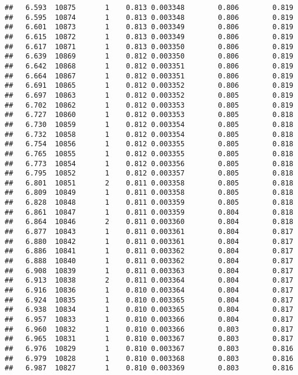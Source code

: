 \documentclass[
]{book}
\begin{document}
\begin{verbatim}
##   6.593  10875       1    0.813 0.003348        0.806        0.819
##   6.595  10874       1    0.813 0.003348        0.806        0.819
##   6.601  10873       1    0.813 0.003349        0.806        0.819
##   6.615  10872       1    0.813 0.003349        0.806        0.819
##   6.617  10871       1    0.813 0.003350        0.806        0.819
##   6.639  10869       1    0.812 0.003350        0.806        0.819
##   6.642  10868       1    0.812 0.003351        0.806        0.819
##   6.664  10867       1    0.812 0.003351        0.806        0.819
##   6.691  10865       1    0.812 0.003352        0.806        0.819
##   6.697  10863       1    0.812 0.003352        0.805        0.819
##   6.702  10862       1    0.812 0.003353        0.805        0.819
##   6.727  10860       1    0.812 0.003353        0.805        0.818
##   6.730  10859       1    0.812 0.003354        0.805        0.818
##   6.732  10858       1    0.812 0.003354        0.805        0.818
##   6.754  10856       1    0.812 0.003355        0.805        0.818
##   6.765  10855       1    0.812 0.003355        0.805        0.818
##   6.773  10854       1    0.812 0.003356        0.805        0.818
##   6.795  10852       1    0.812 0.003357        0.805        0.818
##   6.801  10851       2    0.811 0.003358        0.805        0.818
##   6.809  10849       1    0.811 0.003358        0.805        0.818
##   6.828  10848       1    0.811 0.003359        0.805        0.818
##   6.861  10847       1    0.811 0.003359        0.804        0.818
##   6.864  10846       2    0.811 0.003360        0.804        0.818
##   6.877  10843       1    0.811 0.003361        0.804        0.817
##   6.880  10842       1    0.811 0.003361        0.804        0.817
##   6.886  10841       1    0.811 0.003362        0.804        0.817
##   6.888  10840       1    0.811 0.003362        0.804        0.817
##   6.908  10839       1    0.811 0.003363        0.804        0.817
##   6.913  10838       2    0.811 0.003364        0.804        0.817
##   6.916  10836       1    0.810 0.003364        0.804        0.817
##   6.924  10835       1    0.810 0.003365        0.804        0.817
##   6.938  10834       1    0.810 0.003365        0.804        0.817
##   6.957  10833       1    0.810 0.003366        0.804        0.817
##   6.960  10832       1    0.810 0.003366        0.803        0.817
##   6.965  10831       1    0.810 0.003367        0.803        0.817
##   6.976  10829       1    0.810 0.003367        0.803        0.816
##   6.979  10828       1    0.810 0.003368        0.803        0.816
##   6.987  10827       1    0.810 0.003369        0.803        0.816

\end{verbatim}
\end{document}
